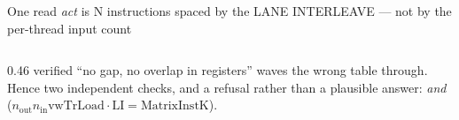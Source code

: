 \begin{frame}{One read \emph{act} is N instructions spaced by the LANE INTERLEAVE --- not by the per-thread input count}
\begin{columns}[T]
\begin{column}{0.46\textwidth}
verified ``no gap, no overlap in registers'' waves the wrong table through. Hence two independent checks, and a
refusal rather than a plausible answer:  \emph{and} 
($n_{\mathrm{out}} n_{\mathrm{in}} \mathrm{vwTrLoad}\cdot\mathrm{LI} = \mathrm{MatrixInstK}$).
\end{column}
\end{columns}
\vspace{1mm}
\end{frame}
